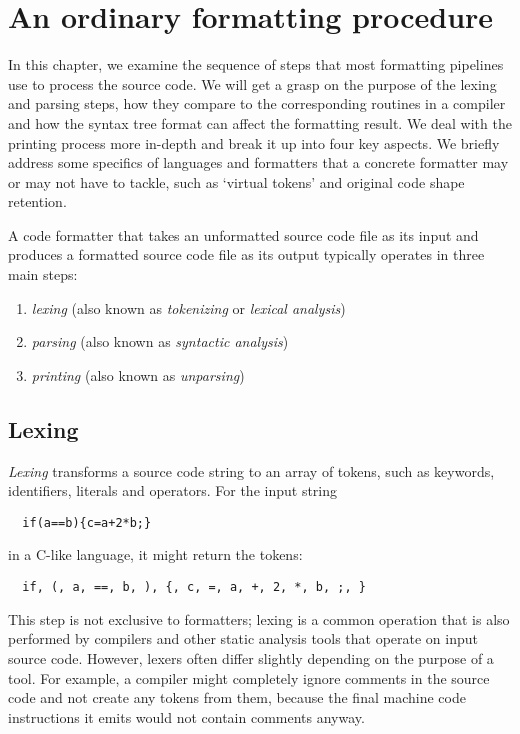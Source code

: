 \chapter{An ordinary formatting procedure}
In this chapter, we examine the sequence of steps
that most formatting pipelines use to process the source code.
We will get a grasp on the purpose of the lexing and parsing steps,
how they compare to the corresponding routines in a compiler and
how the syntax tree format can affect the formatting result.
We deal with the printing process more in-depth and
break it up into four key aspects.
We briefly address some specifics of languages and formatters
that a concrete formatter may or may not have to tackle,
such as `virtual tokens' and original code shape retention.

A code formatter that takes an unformatted source code file as its input and
produces a formatted source code file as its output typically operates in three main steps:
\autocite{parsingBroadSense}\autocite{parsingAndReflectivePrinting}
\begin{enumerate}
  \item \textit{lexing} (also known as \textit{tokenizing} or \textit{lexical analysis})
  \item \textit{parsing} (also known as \textit{syntactic analysis})
  \item \textit{printing} (also known as \textit{unparsing}\autocite{prettyprinting})
\end{enumerate}

\section{Lexing}
\textit{Lexing} transforms a source code string to an array of tokens,
such as keywords, identifiers, literals and operators.
For the input string
\begin{verbatim}
  if(a==b){c=a+2*b;}
\end{verbatim}
in a C-like language, it might return the tokens:
\begin{verbatim}
  if, (, a, ==, b, ), {, c, =, a, +, 2, *, b, ;, }
\end{verbatim}

This step is not exclusive to formatters; lexing is a common operation that is also performed by
compilers and other static analysis tools that operate on input source code.
However, lexers often differ slightly depending on the purpose of a tool.
For example, a compiler might completely ignore comments in the source code and
not create any tokens from them, because the final machine code instructions it emits
would not contain comments anyway.

